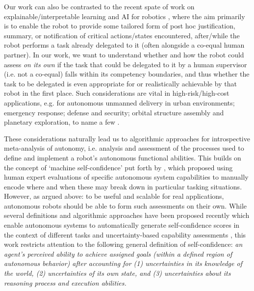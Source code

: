 Our work can also be contrasted to the recent spate of work on explainable/interpretable learning and AI for robotics \cite{...ohgod,somany..}, where the aim primarily is to enable the robot to provide some tailored form of post hoc justification, summary, or notification of critical actions/states encountered, after/while the robot performs a task already delegated to it (often alongside a co-equal human partner). In our work, we want to understand whether and how the robot could assess \emph{on its own} if the task that could be delegated to it by a human supervisor (i.e. not a co-equal) falls within its competency boundaries, and thus whether the task to be delegated is even appropriate for or realistically achievable by that robot in the first place. %
Such considerations are vital in high-risk/high-cost applications, e.g. for autonomous unmanned delivery in urban environments; emergency response; defense and security; orbital structure assembly and planetary exploration, to name a few .   

These considerations naturally lead us to algorithmic approaches for introspective meta-analysis of autonomy, i.e. analysis and assessment of the processes used to define and implement a robot's autonomous functional abilities. This builds on the concept of `machine self-confidence' put forth by \cite{Hutchins2015-if}, which proposed using human expert evaluations of specific autonomous system capabilities to manually encode where and when these may break down in particular tasking situations. However, as argued above: to be useful and scalable for real applications, autonomous robots should be able to form such assessments on their own. While several definitions and algorithmic approaches have been proposed recently which enable autonomous systems to automatically generate self-confidence scores in the context of different tasks and uncertainty-based capability assessments \cite{Sweet2016-tz, Israelsen2017-ym},  this work restricts attention to the following general definition of self-confidence: \textit{an agent's perceived ability to achieve assigned goals (within a defined region of autonomous behavior) after accounting for (1) uncertainties in its knowledge of the world, (2) uncertainties of its own state, and (3) uncertainties about its reasoning process and execution abilities.} %

